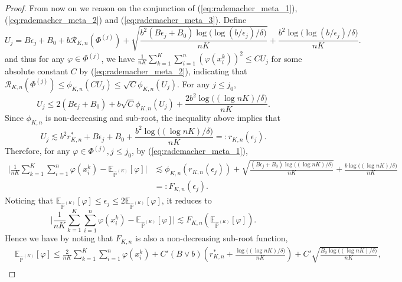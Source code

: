 \documentclass{article}
\numberwithin{equation}{section}
\def\eqref#1{equation~\ref{#1}}
\newcommand{\E}{\mathbb{E}}
\theoremstyle{definition}
\renewcommand{\P}{\mathbb{P}}
\renewcommand{\eqref}[1]{(\ref{#1})}
\begin{document}
\begin{proof}
    From now on we reason on the conjunction of \eqref{eq:rademacher_meta_1}, \eqref{eq:rademacher_meta_2} and \eqref{eq:rademacher_meta_3}.
    Define 
    \begin{equation}\label{eq:def_u_meta}
        U_j = B\epsilon_j+B_0+b\mathcal{R}_{K,n}(\Phi^{(j)})+\sqrt{\frac{b^2(B\epsilon_j+B_0)\log\big(\log(b/\epsilon_j)/\delta\big)}{nK}} + \frac{b^2\log\big(\log(b/\epsilon_j)/\delta\big)}{nK}.
    \end{equation}
    and thus for any $\varphi\in\Phi^{(j)}$, we have $\frac{1}{nK}\sum_{k=1}^K\sum_{i=1}^n(\varphi(x_i^k))^2\leq CU_j$ for some absolute constant $C$ by \eqref{eq:rademacher_meta_2}, indicating that
    $\mathcal{R}_{K,n}(\Phi^{(j)})\leq \phi_{K,n}(CU_j)\leq \sqrt{C}\phi_{K,n}(U_j)$.
    For any $j\leq j_0$,
    \begin{equation}
        U_j \leq 2(B\epsilon_j+B_0)+b\sqrt{C}\phi_{K,n}(U_j)+\frac{2b^2\log\big((\log nK)/\delta\big)}{nK}.
    \end{equation}
    Since $\phi_{K,n}$ is non-decreasing and sub-root, the inequality above implies that
    \begin{equation}
        U_j \lesssim b^2r_{K,n}^*+B\epsilon_j+B_0+\frac{b^2\log\big((\log nK)/\delta\big)}{nK}=:r_{K,n}(\epsilon_j).
    \end{equation}
    Therefore, for any $\varphi\in\Phi^{(j)},j\leq j_0$, by \eqref{eq:rademacher_meta_1},
    \begin{equation}
        \begin{aligned}
            \Big|\frac{1}{nK}\sum_{k=1}^K\sum_{i=1}^n\varphi(x_i^k)-\E_{\widehat{\P}^{(K)}}[\varphi]\Big| 
            &\lesssim \phi_{K,n}(r_{K,n}(\epsilon_j))+\sqrt{\frac{(B\epsilon_j+B_0)\log\big((\log nK)/\delta\big)}{nK}}+\frac{b\log\big((\log nK)/\delta\big)}{nK} \\
            &=: F_{K,n}(\epsilon_j).
        \end{aligned}
    \end{equation}
    Noticing that $\E_{\widehat{\P}^{(K)}}[\varphi]\leq \epsilon_j\leq 2\E_{\widehat{\P}^{(K)}}[\varphi]$, it reduces to
    \begin{equation}
        \Big|\frac{1}{nK}\sum_{k=1}^K\sum_{i=1}^n\varphi(x_i^k)-\E_{\widehat{\P}^{(K)}}[\varphi]\Big|\lesssim F_{K,n}(\E_{\widehat{\P}^{(K)}}[\varphi]).
    \end{equation}
    Hence we have by noting that $F_{K,n}$ is also a non-decreasing sub-root function, 
    \begin{align}
        &\E_{\widehat{\P}^{(K)}}[\varphi]\leq \frac{2}{nK}\sum_{k=1}^K\sum_{i=1}^n\varphi(x_i^k) + C'(B\vee b)\left(r_{K,n}^* + \frac{\log\big((\log nK)/\delta\big)}{nK}\right)+C'\sqrt{\frac{B_0\log\big((\log nK)/\delta\big)}{nK}},\\

\end{align}
\end{proof}
\end{document}
